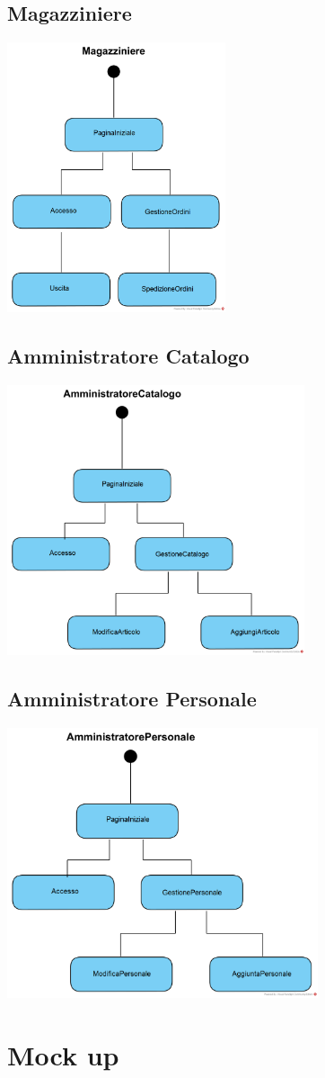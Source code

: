 \documentclass[12pt,a4paper]{article}
\begin{document}
\subsection{Magazziniere}
\begin{center}
\includegraphics[height=300px]{NavigationalPath/Magazziniere}
\end{center}

\subsection{Amministratore Catalogo}
\begin{center}
\includegraphics[height=300px]{NavigationalPath/AmministratoreCatalogo}
\end{center}

\subsection{Amministratore Personale}
\begin{center}
\includegraphics[height=300px]{NavigationalPath/AmministratorePersonale}
\end{center}

\newpage
\section{Mock up}
\end{document}
